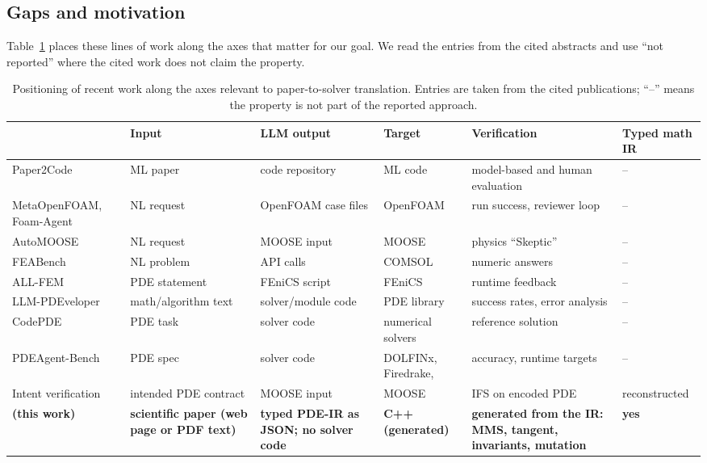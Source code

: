 \subsection{Gaps and motivation}
\label{sec:gaps}

Table~\ref{tab:landscape} places these lines of work along the axes that matter for our goal. We read the entries from the cited abstracts and use ``not reported'' where the cited work does not claim the property.

\begin{table}[t]
\centering\small
\caption{Positioning of recent work along the axes relevant to paper-to-solver translation. Entries are taken from the cited publications; ``--'' means the property is not part of the reported approach.}
\label{tab:landscape}
\setlength{\tabcolsep}{3.5pt}
\begin{tabularx}{\textwidth}{@{}p{2.55cm}p{2.25cm}p{2.5cm}p{2.5cm}p{2.7cm}p{1.8cm}@{}}
\toprule
 & Input & LLM output & Target & Verification & Typed math IR\\
\midrule
Paper2Code \citep{paper2code2025} & ML paper & code repository & ML code & model-based and human evaluation & --\\
MetaOpenFOAM, Foam-Agent \citep{metaopenfoam2024,foamagent2026} & NL request & OpenFOAM case files & OpenFOAM & run success, reviewer loop & --\\
AutoMOOSE \citep{automoose2026} & NL request & MOOSE input & MOOSE & physics ``Skeptic'' & --\\
FEABench \citep{feabench2025} & NL problem & API calls & COMSOL & numeric answers & --\\
ALL-FEM \citep{allfem2026} & PDE statement & FEniCS script & FEniCS & runtime feedback & --\\
LLM-PDEveloper \citep{pdeveloper2025} & math/algorithm text & solver/module code & PDE library & success rates, error analysis & --\\
CodePDE \citep{codepde2025} & PDE task & solver code & numerical solvers & reference solution & --\\
PDEAgent-Bench \citep{pdeagentbench2026} & PDE spec & solver code & DOLFINx, Firedrake, \dealii{} & accuracy, runtime targets & --\\
Intent verification \citep{wrongphysics2026} & intended PDE contract & MOOSE input & MOOSE & IFS on encoded PDE & reconstructed\\
\midrule
\textbf{\femagent{} (this work)} & \textbf{scientific paper (web page or PDF text)} & \textbf{typed PDE-IR as JSON; no solver code} & \textbf{\dealii{} C++ (generated)} & \textbf{generated from the IR: MMS, tangent, invariants, mutation} & \textbf{yes}\\
\bottomrule
\end{tabularx}
\end{table}

